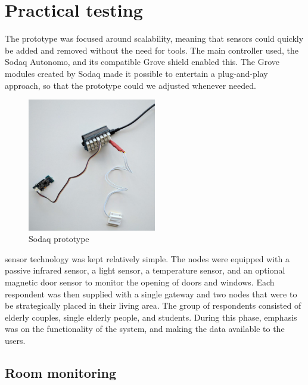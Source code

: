 \documentclass{below-ext}
\begin{document}
\section{Practical testing}
The prototype was focused around scalability, meaning that sensors could quickly be added and removed without the need for tools. The main controller used, the Sodaq Autonomo, and its compatible Grove shield enabled this. The Grove modules created by Sodaq made it possible to entertain a plug-and-play approach, so that the prototype could we adjusted whenever needed. 
\begin{figure}
\label{fig:sodaq}
\includegraphics[width=0.5\textwidth]{sodaq}
\caption{Sodaq prototype}
\end{figure}
sensor technology was kept relatively simple. The nodes were equipped with a passive infrared sensor, a light sensor, a temperature sensor, and an optional magnetic door sensor to monitor the opening of doors and windows. Each respondent was then supplied with a single gateway and two nodes that were to be strategically placed in their living area. The group of respondents consisted of elderly couples, single elderly people, and students. During this phase, emphasis was on the functionality of the system, and making the data available to the users. 

\subsection{Room monitoring}
\end{document}
